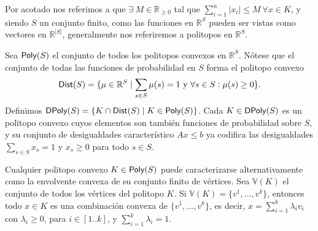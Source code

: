 Por acotado nos referimos a que $\exists \ M \in \mathbb{R}_{\geq 0}$ tal que
$\sum_{i=1}^{n} |x_i| \leq M \ \forall x \in K$, y siendo $S$ un conjunto
finito, como las funciones en $\mathbb{R}^S$ pueden ser vistas como vectores en
$\mathbb{R}^{|S|}$, generalmente nos referiremos a politopos en $\mathbb{R}^S$.

Sea \( \textsf{Poly}(S) \) el conjunto de todos los politopos convexos en \(
\mathbb{R}^S \). Nótese que el conjunto de todas las funciones de probabilidad
en \( S \) forma el politopo convexo $$ \textsf{Dist}(S) = \{ \mu \in \mathbb{R}^S \mid
	\sum_{s \in S} \mu(s) = 1 \text{ y } \forall s \in S : \mu(s) \geq 0 \}. $$
Definimos \( \textsf{DPoly}(S) = \{ K \cap \textsf{Dist}(S) \mid K \in \textsf{Poly}(S) \} \). Cada \(
K \in \textsf{DPoly}(S) \) es un politopo convexo cuyos elementos son también funciones
de probabilidad sobre \( S \), y su conjunto de desigualdades característico \(
Ax \leq b \) ya codifica las desigualdades \\ \( \sum_{s \in S} x_s = 1 \) y \(
x_s \geq 0 \) para todo \( s \in S \).

Cualquier politopo convexo \( K \in \textsf{Poly}(S) \) puede caracterizarse
alternativamente como la envolvente convexa de su conjunto finito de vértices.
Sea \( \mathbb{V}(K) \) el conjunto de todos los vértices del politopo \( K \).
Si \( \mathbb{V}(K) = \{v^1, \dots, v^k\} \), entonces todo \( x \in K \) es
una combinación convexa de \( \{v^1, \dots, v^k\} \), es decir, \( x =
\sum_{i=1}^{k} \lambda_i v_i \) con \( \lambda_i \geq 0 \), para \( i \in
[1..k] \), y \( \sum_{i=1}^{k} \lambda_i = 1 \).




